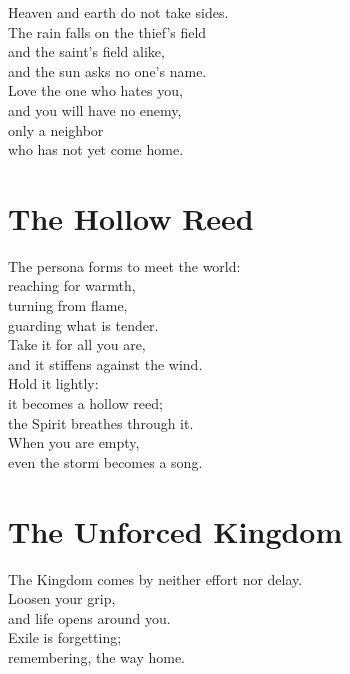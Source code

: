 \documentclass[10pt, openright]{book}
\newcommand{\sectionbreak}{\filbreak}
\newcommand{\sayingsource}[1]{\par\nopagebreak\vspace{0.3\baselineskip}{\raggedleft\footnotesize\itshape #1\par}}
\begin{document}
Heaven and earth do not take sides.\\
The rain falls on the thief's field\\
and the saint's field alike,\\
and the sun asks no one's name.\\
Love the one who hates you,\\
and you will have no enemy,\\
only a neighbor\\
who has not yet come home.

\sayingsource{Tao Te Ching 5 · Didache 1.3 · Matthew 5:45}

\sectionbreak

\section{The Hollow Reed}\label{the-hollow-reed}

The persona forms to meet the world:\\
reaching for warmth,\\
turning from flame,\\
guarding what is tender.\\
Take it for all you are,\\
and it stiffens against the wind.\\
Hold it lightly:\\
it becomes a hollow reed;\\
the Spirit breathes through it.\\
When you are empty,\\
even the storm becomes a song.

\sayingsource{Tao Te Ching 6}

\sectionbreak

\section{The Unforced Kingdom}\label{the-unforced-kingdom}

The Kingdom comes by neither effort nor delay.\\
Loosen your grip,\\
and life opens around you.\\
Exile is forgetting;\\
remembering, the way home.

\sayingsource{Tao Te Ching 7 · Gospel of Truth}

\sectionbreak
\end{document}
